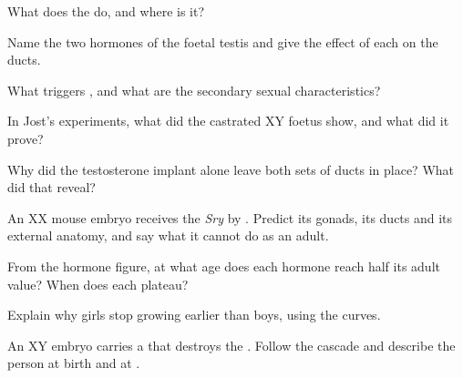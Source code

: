 \begin{exercise}[$\star$]\label{exo:g11:becoming-male-female:3}
What does the  do, and where is it?
\end{exercise}

\begin{exercise}[$\star$]\label{exo:g11:becoming-male-female:4}
Name the two hormones of the foetal testis and give the effect of
each on the ducts.
\end{exercise}

\begin{exercise}[$\star$]\label{exo:g11:becoming-male-female:5}
What triggers , and what are the secondary sexual
characteristics?
\end{exercise}

\begin{exercise}[$\star\star$]\label{exo:g11:becoming-male-female:6}
In Jost's experiments, what did the castrated XY foetus show, and
what did it prove?
\end{exercise}

\begin{exercise}[$\star\star$]\label{exo:g11:becoming-male-female:7}
Why did the testosterone implant alone leave both sets of ducts in
place? What did that reveal?
\end{exercise}

\begin{exercise}[$\star\star$]\label{exo:g11:becoming-male-female:8}
An XX mouse embryo receives the \emph{Sry}  by . Predict
its gonads, its ducts and its external anatomy, and say what it
cannot do as an adult.
\end{exercise}

\begin{exercise}[$\star\star$]\label{exo:g11:becoming-male-female:9}
From the hormone figure, at what age does each hormone reach half its
adult value? When does each plateau?
\end{exercise}

\begin{exercise}[$\star\star$]\label{exo:g11:becoming-male-female:10}
Explain why girls stop growing earlier than boys, using the curves.
\end{exercise}

\begin{exercise}[$\star\star$]\label{exo:g11:becoming-male-female:11}
An XY embryo carries a  that destroys the  . Follow
the cascade and describe the person at birth and at .
\end{exercise}


